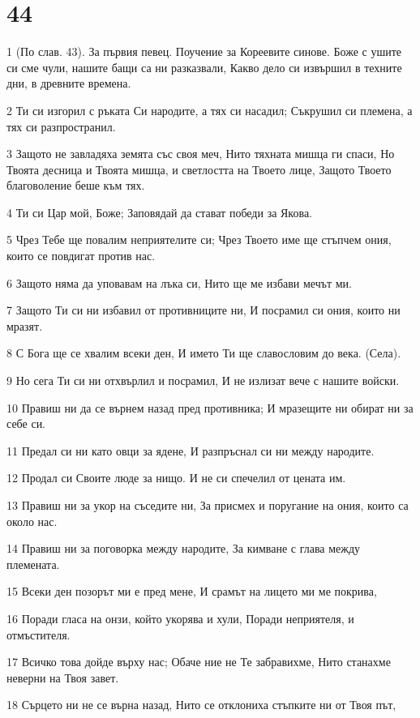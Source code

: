 \chapter{44}

\par 1 (По слав. 43). За първия певец. Поучение за Кореевите синове. Боже с ушите си сме чули, нашите бащи са ни разказвали, Какво дело си извършил в техните дни, в древните времена.
\par 2 Ти си изгорил с ръката Си народите, а тях си насадил; Съкрушил си племена, а тях си разпространил.
\par 3 Защото не завладяха земята със своя меч, Нито тяхната мишца ги спаси, Но Твоята десница и Твоята мишца, и светлостта на Твоето лице, Защото Твоето благоволение беше към тях.
\par 4 Ти си Цар мой, Боже; Заповядай да стават победи за Якова.
\par 5 Чрез Тебе ще повалим неприятелите си; Чрез Твоето име ще стъпчем ония, които се повдигат против нас.
\par 6 Защото няма да уповавам на лъка си, Нито ще ме избави мечът ми.
\par 7 Защото Ти си ни избавил от противниците ни, И посрамил си ония, които ни мразят.
\par 8 С Бога ще се хвалим всеки ден, И името Ти ще славословим до века. (Села).
\par 9 Но сега Ти си ни отхвърлил и посрамил, И не излизат вече с нашите войски.
\par 10 Правиш ни да се върнем назад пред противника; И мразещите ни обират ни за себе си.
\par 11 Предал си ни като овци за ядене, И разпръснал си ни между народите.
\par 12 Продал си Своите люде за нищо. И не си спечелил от цената им.
\par 13 Правиш ни за укор на съседите ни, За присмех и поругание на ония, които са около нас.
\par 14 Правиш ни за поговорка между народите, За кимване с глава между племената.
\par 15 Всеки ден позорът ми е пред мене, И срамът на лицето ми ме покрива,
\par 16 Поради гласа на онзи, който укорява и хули, Поради неприятеля, и отмъстителя.
\par 17 Всичко това дойде върху нас; Обаче ние не Те забравихме, Нито станахме неверни на Твоя завет.
\par 18 Сърцето ни не се върна назад, Нито се отклониха стъпките ни от Твоя път,

